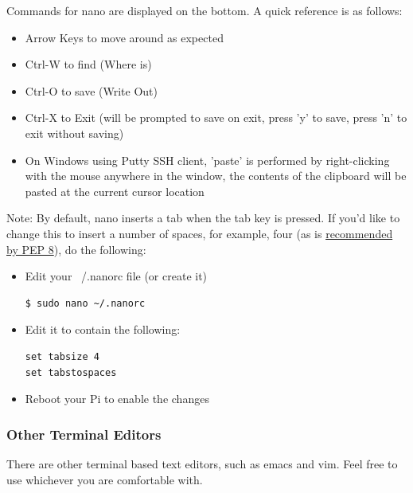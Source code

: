 Commands for nano are displayed on the bottom. A quick reference is as follows:
\begin{itemize}
\item Arrow Keys to move around as expected
\item Ctrl-W to find (Where is)
\item Ctrl-O to save (Write Out)
\item Ctrl-X to Exit (will be prompted to save on exit, press 'y' to save, press 'n' to exit without saving)
\item On Windows using Putty SSH client, 'paste' is performed by right-clicking with the mouse anywhere in the window, the contents of the clipboard will be pasted at the current cursor location
\end{itemize}

Note: By default, nano inserts a tab when the tab key is pressed. If you'd like to change this to insert a number of spaces, for example, four (as is \href{https://www.python.org/dev/peps/pep-0008/#tabs-or-spaces}{recommended by PEP 8}), do the following:
\begin{itemize}
\item Edit your ~/.nanorc file (or create it)
\begin{lstlisting}
$ sudo nano ~/.nanorc
\end{lstlisting}
\item Edit it to contain the following:
\begin{lstlisting}
set tabsize 4
set tabstospaces
\end{lstlisting}
\item Reboot your Pi to enable the changes
\end{itemize}

\subsubsection{Other Terminal Editors}
There are other terminal based text editors, such as emacs and vim. Feel free to use whichever you are comfortable with.

